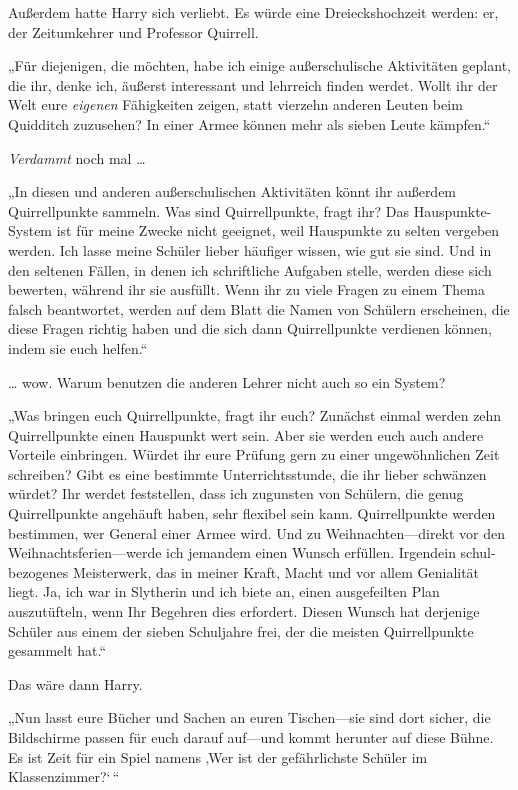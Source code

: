 {Außerdem hatte Harry sich verliebt. Es würde eine Dreieckshochzeit werden: er, der Zeitumkehrer und Professor Quirrell.

„Für diejenigen, die möchten, habe ich einige außerschulische Aktivitäten geplant, die ihr, denke ich, äußerst interessant und lehrreich finden werdet. Wollt ihr der Welt eure \emph{eigenen} Fähigkeiten zeigen, statt vierzehn anderen Leuten beim Quidditch zuzusehen? In einer Armee können mehr als sieben Leute kämpfen.“

\emph{Verdammt} noch mal …

„In diesen und anderen außerschulischen Aktivitäten könnt ihr außerdem Quirrellpunkte sammeln. Was sind Quirrellpunkte, fragt ihr? Das Hauspunkte-System ist für meine Zwecke nicht geeignet, weil Hauspunkte zu selten vergeben werden. Ich lasse meine Schüler lieber häufiger wissen, wie gut sie sind. Und in den seltenen Fällen, in denen ich schriftliche Aufgaben stelle, werden diese sich bewerten, während ihr sie ausfüllt. Wenn ihr zu viele Fragen zu einem Thema falsch beantwortet, werden auf dem Blatt die Namen von Schülern erscheinen, die diese Fragen richtig haben und die sich dann Quirrellpunkte verdienen können, indem sie euch helfen.“

… wow. Warum benutzen die anderen Lehrer nicht auch so ein System?

„Was bringen euch Quirrellpunkte, fragt ihr euch? Zunächst einmal werden zehn Quirrellpunkte einen Hauspunkt wert sein. Aber sie werden euch auch andere Vorteile einbringen. Würdet ihr eure Prüfung gern zu einer ungewöhnlichen Zeit schreiben? Gibt es eine bestimmte Unterrichtsstunde, die ihr lieber schwänzen würdet? Ihr werdet feststellen, dass ich zugunsten von Schülern, die genug Quirrellpunkte angehäuft haben, sehr flexibel sein kann. Quirrellpunkte werden bestimmen, wer General einer Armee wird. Und zu Weihnachten—direkt vor den Weihnachtsferien—werde ich jemandem einen Wunsch erfüllen. Irgendein schul-bezogenes Meisterwerk, das in meiner Kraft, Macht und vor allem Genialität liegt. Ja, ich war in Slytherin und ich biete an, einen ausgefeilten Plan auszutüfteln, wenn Ihr Begehren dies erfordert. Diesen Wunsch hat derjenige Schüler aus einem der sieben Schuljahre frei, der die meisten Quirrellpunkte gesammelt hat.“

Das wäre dann Harry.

„Nun lasst eure Bücher und Sachen an euren Tischen—sie sind dort sicher, die Bildschirme passen für euch darauf auf—und kommt herunter auf diese Bühne. Es ist Zeit für ein Spiel namens ‚Wer ist der gefährlichste Schüler im Klassenzimmer?`\,“

}
